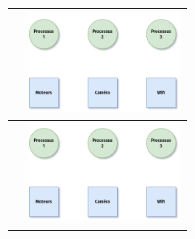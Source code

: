 \documentclass[12pt,a4paper,article,english,firamath]{nsi}
\newcommand{\truc}{4cm}
\begin{document}
\begin{center}
\begin{tabular}{|c|c|}
        \hline
                                                                 & \includegraphics[width=\truc]{img/d6.png}                \\
        \hline
                                                                 & \includegraphics[width=\truc]{img/d6.png}                \\
        \hline
    \end{tabular}
\end{center}
\newpage
\end{document}
